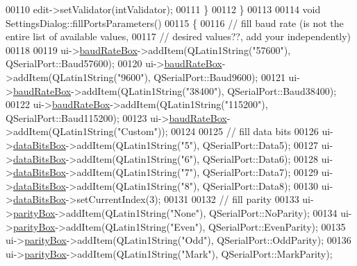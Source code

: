 \begin{DoxyCode}
{{{{{00110         edit->setValidator(intValidator);
00111     \}
00112 \}
00113 
00114 \textcolor{keywordtype}{void} SettingsDialog::fillPortsParameters()
00115 \{
00116     \textcolor{comment}{// fill baud rate (is not the entire list of available values,}
00117     \textcolor{comment}{// desired values??, add your independently)}
00118 
00119     ui->\hyperlink{a00082_a766a61db4a8c72219543f7c096ae5601}{baudRateBox}->addItem(QLatin1String(\textcolor{stringliteral}{"57600"}), QSerialPort::Baud57600);
00120     ui->\hyperlink{a00082_a766a61db4a8c72219543f7c096ae5601}{baudRateBox}->addItem(QLatin1String(\textcolor{stringliteral}{"9600"}), QSerialPort::Baud9600);
00121     ui->\hyperlink{a00082_a766a61db4a8c72219543f7c096ae5601}{baudRateBox}->addItem(QLatin1String(\textcolor{stringliteral}{"38400"}), QSerialPort::Baud38400);
00122     ui->\hyperlink{a00082_a766a61db4a8c72219543f7c096ae5601}{baudRateBox}->addItem(QLatin1String(\textcolor{stringliteral}{"115200"}), QSerialPort::Baud115200);
00123     ui->\hyperlink{a00082_a766a61db4a8c72219543f7c096ae5601}{baudRateBox}->addItem(QLatin1String(\textcolor{stringliteral}{"Custom"}));
00124 
00125     \textcolor{comment}{// fill data bits}
00126     ui->\hyperlink{a00082_ab6082bb196e22af4ca04a04db3402166}{dataBitsBox}->addItem(QLatin1String(\textcolor{stringliteral}{"5"}), QSerialPort::Data5);
00127     ui->\hyperlink{a00082_ab6082bb196e22af4ca04a04db3402166}{dataBitsBox}->addItem(QLatin1String(\textcolor{stringliteral}{"6"}), QSerialPort::Data6);
00128     ui->\hyperlink{a00082_ab6082bb196e22af4ca04a04db3402166}{dataBitsBox}->addItem(QLatin1String(\textcolor{stringliteral}{"7"}), QSerialPort::Data7);
00129     ui->\hyperlink{a00082_ab6082bb196e22af4ca04a04db3402166}{dataBitsBox}->addItem(QLatin1String(\textcolor{stringliteral}{"8"}), QSerialPort::Data8);
00130     ui->\hyperlink{a00082_ab6082bb196e22af4ca04a04db3402166}{dataBitsBox}->setCurrentIndex(3);
00131 
00132     \textcolor{comment}{// fill parity}
00133     ui->\hyperlink{a00082_a88c0b5d1f96a308ab115937b090f7bba}{parityBox}->addItem(QLatin1String(\textcolor{stringliteral}{"None"}), QSerialPort::NoParity);
00134     ui->\hyperlink{a00082_a88c0b5d1f96a308ab115937b090f7bba}{parityBox}->addItem(QLatin1String(\textcolor{stringliteral}{"Even"}), QSerialPort::EvenParity);
00135     ui->\hyperlink{a00082_a88c0b5d1f96a308ab115937b090f7bba}{parityBox}->addItem(QLatin1String(\textcolor{stringliteral}{"Odd"}), QSerialPort::OddParity);
00136     ui->\hyperlink{a00082_a88c0b5d1f96a308ab115937b090f7bba}{parityBox}->addItem(QLatin1String(\textcolor{stringliteral}{"Mark"}), QSerialPort::MarkParity);
}}}}}
\end{DoxyCode}
